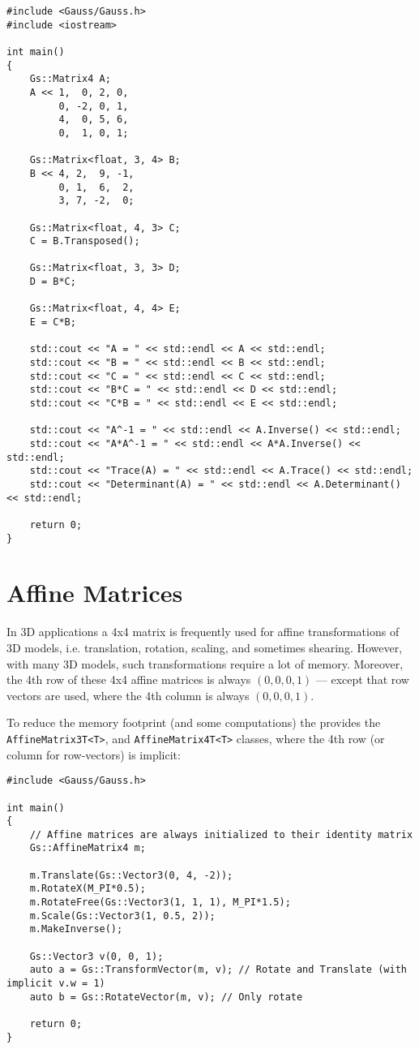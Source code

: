 \documentclass{article}
\begin{document}
\begin{lstlisting}
#include <Gauss/Gauss.h>
#include <iostream>

int main()
{
	Gs::Matrix4 A;
	A << 1,  0, 2, 0,
	     0, -2, 0, 1,
	     4,  0, 5, 6,
	     0,  1, 0, 1;
	
	Gs::Matrix<float, 3, 4> B;
	B << 4, 2,  9, -1,
	     0, 1,  6,  2,
	     3, 7, -2,  0;
	
	Gs::Matrix<float, 4, 3> C;
	C = B.Transposed();
	
	Gs::Matrix<float, 3, 3> D;
	D = B*C;
	
	Gs::Matrix<float, 4, 4> E;
	E = C*B;
	
	std::cout << "A = " << std::endl << A << std::endl;
	std::cout << "B = " << std::endl << B << std::endl;
	std::cout << "C = " << std::endl << C << std::endl;
	std::cout << "B*C = " << std::endl << D << std::endl;
	std::cout << "C*B = " << std::endl << E << std::endl;
	
	std::cout << "A^-1 = " << std::endl << A.Inverse() << std::endl;
	std::cout << "A*A^-1 = " << std::endl << A*A.Inverse() << std::endl;
	std::cout << "Trace(A) = " << std::endl << A.Trace() << std::endl;
	std::cout << "Determinant(A) = " << std::endl << A.Determinant() << std::endl;

	return 0;
}
\end{lstlisting}



\section*{Affine Matrices}
\label{sec:affine_matrices}

In 3D applications a 4x4 matrix is frequently used for affine transformations of 3D models,
i.e. translation, rotation, scaling, and sometimes shearing.
However, with many 3D models, such transformations require a lot of memory.
Moreover, the 4th row of these 4x4 affine matrices is always $(0, 0, 0, 1)$ --- except that row vectors are used,
where the 4th column is always $(0, 0, 0, 1)$.

To reduce the memory footprint (and some computations) the \gausslib provides the \texttt{AffineMatrix3T<T>},
and \texttt{AffineMatrix4T<T>} classes, where the 4th row (or column for row-vectors) is implicit:
\begin{lstlisting}
#include <Gauss/Gauss.h>

int main()
{
	// Affine matrices are always initialized to their identity matrix
	Gs::AffineMatrix4 m;
	
	m.Translate(Gs::Vector3(0, 4, -2));
	m.RotateX(M_PI*0.5);
	m.RotateFree(Gs::Vector3(1, 1, 1), M_PI*1.5);
	m.Scale(Gs::Vector3(1, 0.5, 2));
	m.MakeInverse();
	
	Gs::Vector3 v(0, 0, 1);
	auto a = Gs::TransformVector(m, v); // Rotate and Translate (with implicit v.w = 1)
	auto b = Gs::RotateVector(m, v); // Only rotate
	
	return 0;
}
\end{lstlisting}
\end{document}

